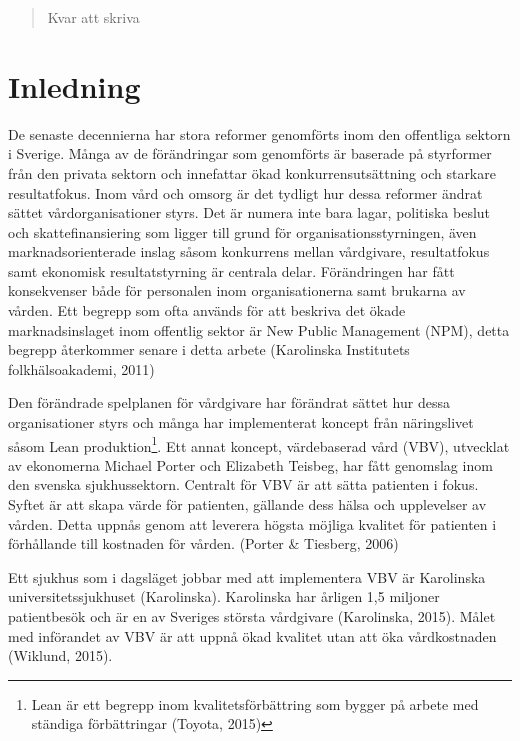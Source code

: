 \newpage

\begin{abstract}
Kvar att skriva
\end{abstract}

\tableofcontents

\clearpage
{} 

\section{Inledning}

De senaste decennierna har stora reformer genomförts inom den offentliga sektorn i Sverige. Många av de förändringar som genomförts är baserade på styrformer från den privata sektorn och innefattar ökad konkurrensutsättning och starkare resultatfokus. Inom vård och omsorg är det tydligt hur dessa reformer ändrat sättet vårdorganisationer styrs. Det är numera inte bara lagar, politiska beslut och skattefinansiering som ligger till grund för organisationsstyrningen, även marknadsorienterade inslag såsom konkurrens mellan vårdgivare, resultatfokus samt ekonomisk resultatstyrning är centrala delar. Förändringen har fått konsekvenser både för personalen inom organisationerna samt brukarna av vården. Ett begrepp som ofta används för att beskriva det ökade marknadsinslaget inom offentlig sektor är New Public Management (NPM), detta begrepp återkommer senare i detta arbete (Karolinska Institutets folkhälsoakademi, 2011)
 
Den förändrade spelplanen för vårdgivare har förändrat sättet hur dessa organisationer styrs och många har implementerat koncept från näringslivet såsom Lean produktion\footnote{ Lean är ett begrepp inom kvalitetsförbättring som bygger på arbete med ständiga förbättringar (Toyota, 2015)}. Ett annat koncept, värdebaserad vård (VBV), utvecklat av ekonomerna Michael Porter och Elizabeth Teisbeg, har fått genomslag inom den svenska sjukhussektorn. Centralt för VBV är att sätta patienten i fokus. Syftet är att skapa värde för patienten, gällande dess hälsa och upplevelser av vården. Detta uppnås genom att leverera högsta möjliga kvalitet för patienten i förhållande till kostnaden för vården. (Porter \& Tiesberg, 2006)
 
Ett sjukhus som i dagsläget jobbar med att implementera VBV är Karolinska universitetssjukhuset (Karolinska). Karolinska har årligen 1,5 miljoner patientbesök och är en av Sveriges största vårdgivare (Karolinska, 2015). Målet med införandet av VBV är att uppnå ökad kvalitet utan att öka vårdkostnaden (Wiklund, 2015).

